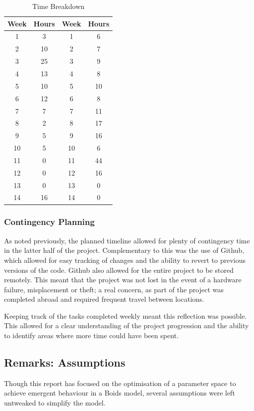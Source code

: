 \documentclass[12pt]{article}
\begin{document}
\begin{table}[ht]
    \centering
    \begin{tabular}{|c|c||c|c|}
        \hline
        Week & Hours & Week & Hours \\
        \hline
        1 & 3 & 1 & 6 \\
        2 & 10 & 2 & 7 \\
        3 & 25 & 3 & 9 \\
        4 & 13 & 4 & 8 \\
        5 & 10 & 5 & 10 \\
        6 & 12 & 6 & 8 \\
        7 & 7 & 7 & 11 \\
        8 & 2 & 8 & 17 \\
        9 & 5 & 9 & 16 \\
        10 & 5 & 10 & 6 \\
        11 & 0 & 11 & 44 \\
        12 & 0 & 12 & 16 \\
        13 & 0 & 13 & 0 \\
        14 & 16 & 14 & 0 \\
        \hline
    \end{tabular}
    \caption{Time Breakdown}
    \label{tab:time-breakdown}
\end{table}

\subsubsection{Contingency Planning}
As noted previously, the planned timeline allowed for plenty of contingency time in the latter half of the project. Complementary to this was the use of Github, which allowed for easy tracking of changes and the ability to revert to previous versions of the code. Github also allowed for the entire project to be stored remotely. This meant that the project was not lost in the event of a hardware failure, misplacement or theft; a real concern, as part of the project was completed abroad and required frequent travel between locations.

Keeping track of the tasks completed weekly meant this reflection was possible. This allowed for a clear understanding of the project progression and the ability to identify areas where more time could have been spent. 


\subsection{Remarks: Assumptions}
Though this report has focused on the optimisation of a parameter space to achieve emergent behaviour in a Boids model, several assumptions were left untweaked to simplify the model.
\end{document}
